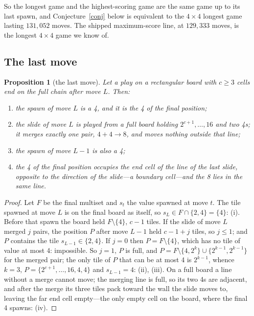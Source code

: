 \documentclass[11pt]{article}
\newtheorem{proposition}[theorem]{Proposition}
\theoremstyle{definition}
\theoremstyle{remark}
\begin{document}
So the longest game and the highest-scoring game are the same game up to
its last spawn, and Conjecture~\ref{conj} below is equivalent to the
$4\times4$ longest game lasting $131{,}052$ moves. The shipped
maximum-score line, at $129{,}333$ moves, is the longest $4\times4$ game
we know of.

\subsection{The last move}

\begin{proposition}[the last move]\label{prop:lastmove}
Let a play on a rectangular board with $c\ge3$ cells end on the full chain
after move $L$. Then:
\begin{enumerate}[nosep,label=(\roman*)]
\item the spawn of move $L$ is a 4, and it is the 4 of the final position;
\item the slide of move $L$ is played from a full board holding
$2^{c+1},\dots,16$ and two 4s; it merges exactly one pair, $4+4\to8$, and
moves nothing outside that line;
\item the spawn of move $L-1$ is also a 4;
\item the 4 of the final position occupies the end cell of the line of the
last slide, opposite to the direction of the slide---a boundary cell---and
the 8 lies in the same line.
\end{enumerate}
\end{proposition}
\begin{proof}
Let $F$ be the final multiset and $s_t$ the value spawned at move $t$. The
tile spawned at move $L$ is on the final board as itself, so
$s_L\in F\cap\{2,4\}=\{4\}$: (i). Before that spawn the board held
$F\setminus\{4\}$, $c-1$ tiles. If the slide of move $L$ merged $j$ pairs,
the position $P$ after move $L-1$ held $c-1+j$ tiles, so $j\le1$; and $P$
contains the tile $s_{L-1}\in\{2,4\}$. If $j=0$ then $P=F\setminus\{4\}$,
which has no tile of value at most 4: impossible. So $j=1$, $P$ is full,
and $P=F\setminus\{4,2^k\}\cup\{2^{k-1},2^{k-1}\}$ for the merged pair;
the only tile of $P$ that can be at most 4 is $2^{k-1}$, whence $k=3$,
$P=\{2^{c+1},\dots,16,4,4\}$ and $s_{L-1}=4$: (ii), (iii). On a full board
a line without a merge cannot move; the merging line is full, so its two
4s are adjacent, and after the merge its three tiles pack toward the wall
the slide moves to, leaving the far end cell empty---the only empty cell
on the board, where the final 4 spawns: (iv).
\end{proof}
\end{document}
